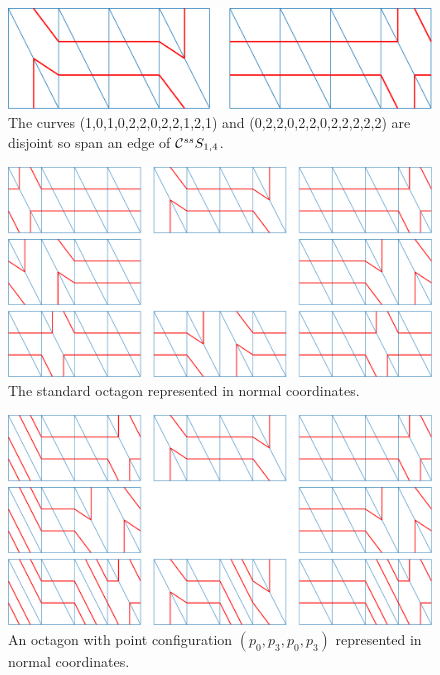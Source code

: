 \begin{figure}[h!]
  \centering
  \includegraphics[width=\textwidth]{figures/oct/oneedge.pdf}
  \caption{The curves (1,0,1,0,2,2,0,2,2,1,2,1) and (0,2,2,0,2,2,0,2,2,2,2,2) are disjoint so span an edge of $ \mathcal C^{{ss}}  S_{1,4}$.}
  \label{fig:s14edge}
\end{figure}



\begin{figure}[h!]
  \centering
  \includegraphics[width=\textwidth]{figures/oct/octstandard1.pdf}
  \caption{The standard octagon represented in normal coordinates.}
  \label{fig:0123oct}
\end{figure}
\begin{figure}[h!]
  \centering
  \includegraphics[width=\textwidth]{figures/oct/oct0303.pdf}
  \caption{An octagon with point configuration $(p_0,p_3,p_0,p_3)$ represented in normal coordinates.  }
  \label{fig:0303oct}
\end{figure}
